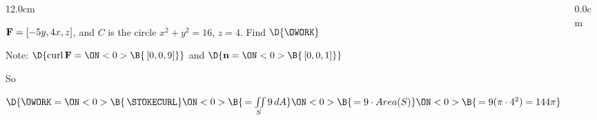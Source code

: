 %
%
%
%
%	

\begin{frame}
\begin{columns}\begin{column}{12.0cm}
\scriptsize

\EX ${\bf F} = [-5y,4x,z]$, and $C$ is the circle $x^2 + y^2 = 16$, $z=4$. \quad Find $\D{\OWORK}$

\vspace{0.4cm}

Note:
$\D{
\text{curl}\, {\bf F} =
\ON<0>{\B{\, [0,0,9]}}}$ \quad and $\D{{\bf n} = 
\ON<0>{\B{\,[0,0,1]}}}$

\vspace{0.4cm}

So 

\vspace{0.4cm}

$\D{\OWORK = 
\ON<0>{\B{\,\STOKECURL}}
\ON<0>{\B{\, = \iint \limits_{S} 9\, dA}}
\ON<0>{\B{\, = 9 \cdot Area(S)}}
\ON<0>{\B{\, = 9 (\pi \cdot 4^2) = 144 \pi}}}$

\vspace{9.2cm}

\end{column}\begin{column}{0.0cm}\end{column}\end{columns}
\end{frame}

